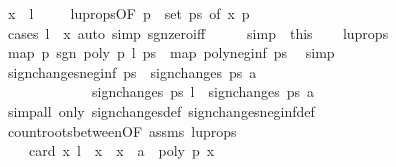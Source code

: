 \begin{isabellebody}
\ {\isachardoublequoteopen}x\ {\isachargreater}\ {\isacharquery}l{\isachardoublequoteclose}\isanewline
\ \ \ \isamarkupfalse%
\ lu{\isacharunderscore}props{\isacharparenleft}{}{\isacharparenright}{\isacharbrackleft}OF\ {\isacharbackquoteopen}p\ {\isasymin}\ set\ ps{\isacharbackquoteclose}{\isacharcomma}\ of\ x{\isacharbrackright}\ {\isacharbackquoteopen}p\ {\isasymnoteq}\ {}{\isacharbackquoteclose}\isanewline
\ \ \ \ \ \ \ \isamarkupfalse%
\ {\isacharparenleft}cases\ {\isachardoublequoteopen}l\ {\isacharless}\ x{\isachardoublequoteclose}{\isacharcomma}\ auto\ simp{\isacharcolon}\ sgn{\isacharunderscore}zero{\isacharunderscore}iff{\isacharparenright}\isanewline
\ \ \isacommand{{\isacharbraceright}}\isamarkupfalse%
\ \isamarkupfalse%
\ {\isacharbrackleft}simp{\isacharbrackright}\ {\isacharequal}\ this\isanewline
\isanewline
\ \ \isamarkupfalse%
\ lu{\isacharunderscore}props\isanewline
\ \ \ \ \isamarkupfalse%
\ {\isachardoublequoteopen}map\ {\isacharparenleft}{\isasymlambda}p{\isachardot}\ sgn\ {\isacharparenleft}poly\ p\ {\isacharquery}l{\isacharparenright}{\isacharparenright}\ ps\ {\isacharequal}\ map\ poly{\isacharunderscore}neg{\isacharunderscore}inf\ ps{\isachardoublequoteclose}\ \isamarkupfalse%
\ simp\isanewline
\ \ \isamarkupfalse%
\ {\isachardoublequoteopen}sign{\isacharunderscore}changes{\isacharunderscore}neg{\isacharunderscore}inf\ ps\ {\isacharminus}\ sign{\isacharunderscore}changes\ ps\ a\ {\isacharequal}\isanewline
\ \ \ \ \ \ \ \ \ \ \ \ \ sign{\isacharunderscore}changes\ ps\ {\isacharquery}l\ {\isacharminus}\ sign{\isacharunderscore}changes\ ps\ a{\isachardoublequoteclose}\isanewline
\ \ \ \ \ \ \isamarkupfalse%
\ {\isacharparenleft}simp{\isacharunderscore}all\ only{\isacharcolon}\ sign{\isacharunderscore}changes{\isacharunderscore}def\ sign{\isacharunderscore}changes{\isacharunderscore}neg{\isacharunderscore}inf{\isacharunderscore}def{\isacharparenright}\isanewline
\ \ \isamarkupfalse%
\ \isamarkupfalse%
\ count{\isacharunderscore}roots{\isacharunderscore}between{\isacharbrackleft}OF\ assms{\isacharbrackright}\ lu{\isacharunderscore}props\isanewline
\ \ \ \ \ \ \isamarkupfalse%
\ {\isachardoublequoteopen}{\isachardot}{\isachardot}{\isachardot}\ {\isacharequal}\ \ card\ {\isacharbraceleft}x{\isachardot}\ {\isacharquery}l\ {\isacharless}\ x\ {\isasymand}\ x\ {\isasymle}\ a\ {\isasymand}\ poly\ p\ x\ {\isacharequal}\ {}{\isacharbraceright}{\isachardoublequoteclose}\ \isamarkupfalse%

\end{isabellebody}
